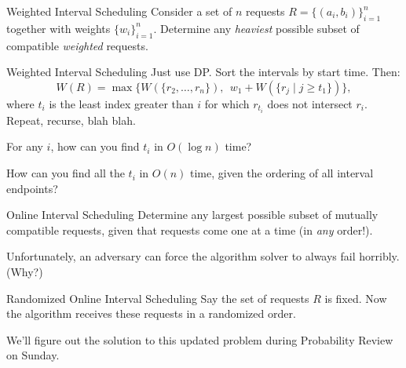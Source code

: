 \begin{problem}{Weighted Interval Scheduling}
Consider a set of $n$ requests $R = \{(a_i, b_i)\}_{i = 1}^n$ together with weights $\{w_i\}_{i = 1}^n$.  Determine any \emph{heaviest} possible subset of compatible \emph{weighted} requests.
\end{problem}

\begin{solution}{Weighted Interval Scheduling}
    Just use DP.  Sort the intervals by start time.  Then:
    \[ W(R) = \max \{ W(\{r_2, \dots, r_n\}), \ \  w_1 + W(\{r_j \mid j \geq t_1\})\}, \]
    where $t_i$ is the least index greater than $i$ for which $r_{t_i}$ does not intersect $r_i$.  Repeat, recurse, blah blah.
\end{solution}

\begin{remark}
    For any $i$, how can you find $t_i$ in $O(\log n)$ time?
    
    How can you find all the $t_i$ in $O(n)$ time, given the ordering of all interval endpoints?
\end{remark}

\begin{problem}{Online Interval Scheduling}
Determine any largest possible subset of mutually compatible requests, given that requests come one at a time (in \emph{any} order!).
\end{problem}

Unfortunately, an adversary can force the algorithm solver to always fail horribly.  (Why?)

\begin{problem}{Randomized Online Interval Scheduling}
Say the set of requests $R$ is fixed.  Now the algorithm receives these requests in a randomized order.
\end{problem}

We'll figure out the solution to this updated problem during Probability Review on Sunday.